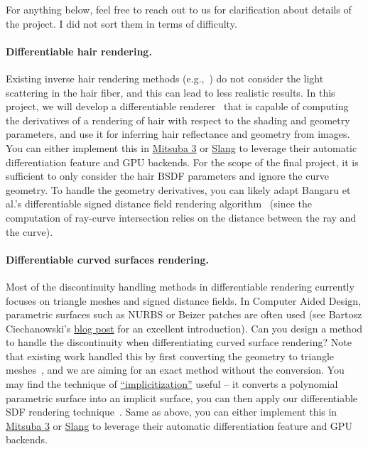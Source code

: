 For anything below, feel free to reach out to us for clarification about details of the project.
I did not sort them in terms of difficulty.

\paragraph{Differentiable hair rendering.}
Existing inverse hair rendering methods (e.g.,~\cite{Rosu:2022:NSL}) do not consider the light scattering in the hair fiber, and this can lead to less realistic results.
In this project, we will develop a differentiable renderer~\cite{Li:2018:DMC} that is capable of computing the derivatives of a rendering of hair with respect to the shading and geometry parameters, and use it for inferring hair reflectance and geometry from images.
You can either implement this in \href{https://github.com/mitsuba-renderer/mitsuba3}{Mitsuba 3} or \href{https://developer.nvidia.com/blog/differentiable-slang-example-applications/}{Slang} to leverage their automatic differentiation feature and GPU backends.
For the scope of the final project, it is sufficient to only consider the hair BSDF parameters and ignore the curve geometry.
To handle the geometry derivatives, you can likely adapt Bangaru et al.'s differentiable signed distance field rendering algorithm~\cite{Bangaru:2022:DRN} (since the computation of ray-curve intersection relies on the distance between the ray and the curve).

\paragraph{Differentiable curved surfaces rendering.}
Most of the discontinuity handling methods in differentiable rendering currently focuses on triangle meshes and signed distance fields. In Computer Aided Design, parametric surfaces such as NURBS or Beizer patches are often used (see Bartosz Ciechanowski's \href{https://ciechanow.ski/curves-and-surfaces/}{blog post} for an excellent introduction). Can you design a method to handle the discontinuity when differentiating curved surface rendering? Note that existing work handled this by first converting the geometry to triangle meshes~\cite{Worchel:2023:DRP}, and we are aiming for an exact method without the conversion. You may find the technique of \href{https://web.mit.edu/hyperbook/Patrikalakis-Maekawa-Cho/node68.html}{``implicitization''} useful -- it converts a polynomial parametric surface into an implicit surface, you can then apply our differentiable SDF rendering technique~\cite{Bangaru:2022:DRN}.
Same as above, you can either implement this in \href{https://github.com/mitsuba-renderer/mitsuba3}{Mitsuba 3} or \href{https://developer.nvidia.com/blog/differentiable-slang-example-applications/}{Slang} to leverage their automatic differentiation feature and GPU backends.

